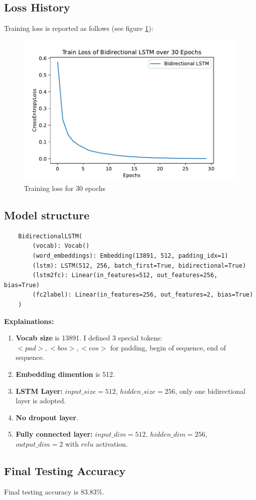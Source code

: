 \subsection*{Loss History}
Training loss is reported as follows (see figure \ref{fig:training_loss}):

\begin{figure}[ht]
    \begin{center}
        \includegraphics*[]{figs/loss.pdf}
        \caption[]{Training loss for 30 epochs}
        \label{fig:training_loss}
    \end{center}
\end{figure}

\subsection*{Model structure}

\begin{verbatim}
    BidirectionalLSTM(
        (vocab): Vocab()
        (word_embeddings): Embedding(13891, 512, padding_idx=1)
        (lstm): LSTM(512, 256, batch_first=True, bidirectional=True)
        (lstm2fc): Linear(in_features=512, out_features=256, bias=True)
        (fc2label): Linear(in_features=256, out_features=2, bias=True)
    )
\end{verbatim}
\textbf{Explainations:}
\begin{enumerate}
    \item \textbf{Vocab size} is 13891. I defined 3 special tokens: $<pad>, <bos>, <eos>$ for padding, begin of sequence, end of sequence.
    \item \textbf{Embedding dimention} is 512.
    \item \textbf{LSTM Layer:} $input\_size=512$, $hidden\_size=256$, only one bidirectional layer is adopted.
    \item \textbf{No dropout layer}.
    \item \textbf{Fully connected layer:} $input\_dim=512$, $hidden\_dim=256$, $output\_dim=2$ with $relu$ activation.
\end{enumerate}


\subsection*{Final Testing Accuracy}

Final testing accuracy is $83.83\%$.
